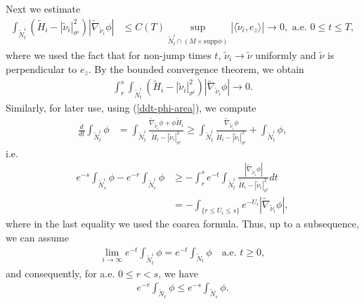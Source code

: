 \documentclass[11pt, letterpaper]{amsart}
\theoremstyle{definition}
\theoremstyle{remark}
\begin{document}
Next we estimate
\begin{align*}
	 \int_{\tilde{N}^{i}_{t}} (\tilde{H}_i - |\tilde{\nu }_{i}|^2_{\sigma ^{i}})|\tilde{\nabla }_{\tilde{\nu }_i} \phi | &\leq  C(T) \sup_{\tilde{N}^{i}_t \cap (M \times \mathrm{supp} \phi )}|\langle \tilde{\nu }_i, e_{z} \rangle |  \to 0, \text{ a.e. } 0\leq t \leq T,
\end{align*} 
where we used the fact that for non-jump times $t$, $ \tilde{\nu }_i \to \tilde{\nu } $ uniformly and $\tilde{\nu } $ is perpendicular to $e_z$. By the bounded convergence theorem, we obtain
\begin{align}
	\int_{r}^{s}   \int_{\tilde{N}^{i}_t} (\tilde{H}_i - |\tilde{\nu }_{i}|^2_{\sigma ^{i}})|\tilde{\nabla }_{\tilde{\nu }_i} \phi |  \to 0.
\end{align}
Similarly, for later use, using (\ref{ddt-phi-area}), we compute
\begin{align*}
	\frac{d}{d t} \int_{\tilde{N}^{i}_t} \phi &= \int_{\tilde{N}^{i}_t} \frac{\tilde{\nabla} _{\tilde{\nu}_i } \phi + \phi \tilde{H}_i}{\tilde{H}_i - |\tilde{\nu }_i|^2_{\sigma ^{i}}} \geq \int_{\tilde{N}^{i}_t} \frac{\tilde{\nabla }_{\tilde{\nu }_i} \phi }{\tilde{H}_i - |\tilde{\nu }_i|^2_{\sigma ^i}} + \int_{\tilde{N}^{i}_t} \phi ,
\end{align*}
i.e.
\begin{align*}
	e ^{-s} \int_{\tilde{N}^{i}_s} \phi - e ^{-r} \int_{\tilde{N}^{i}_r} \phi &\geq - \int_{r}^{s}e ^{-t}\int_{\tilde{N}^{i}_t} \frac{|\tilde{\nabla }_{\tilde{\nu }_i} \phi| }{\tilde{H}_i - |\tilde{\nu }_i|^2_{\sigma ^i}} d t \\
										  &= - \int_{\{r \leq U_i \leq s\} } e ^{- U_i} |\tilde{\nabla }_{\tilde{\nu }_i} \phi|,
\end{align*} 
where in the last equality we used the coarea formula. Thus, up to a subsequence, we can assume
\begin{align}\label{N_t-limit-exists}
	\lim_{i\to \infty} e ^{-t}\int_{\tilde{N}^{i}_{t}} \phi = e ^{-t} \int_{\tilde{N}_t} \phi   \quad \text{a.e. } t \geq 0,
\end{align}
and consequently, for a.e. $0\leq r<s$, we have
\begin{align}\label{limit-area-increasing}
	e ^{-r} \int_{\tilde{N}_{r}} \phi \leq e ^{-s}\int_{\tilde{N}_{s}} \phi .
\end{align} 
\end{document}

